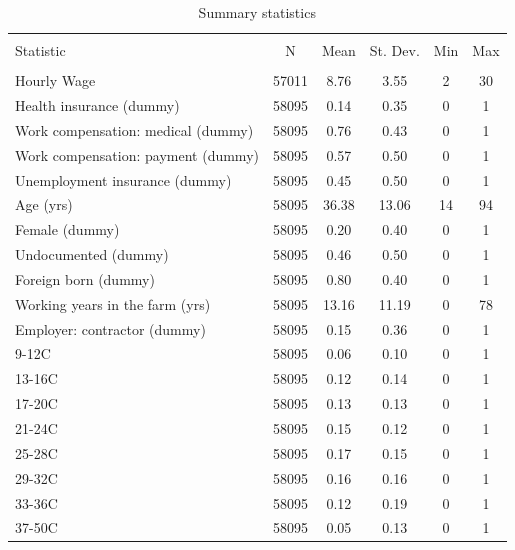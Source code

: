 \documentclass[12pt]{article}
\begin{document}
\begin{table}[!h] 
\centering 
\caption{Summary statistics}
  \footnotesize
  \label{summarystat} 
\begin{tabular}{@{\extracolsep{5pt}}lccccc} 
\\[-1.8ex]\hline 
\hline \\[-1.8ex] 
Statistic & \multicolumn{1}{c}{N} & \multicolumn{1}{c}{Mean} & \multicolumn{1}{c}{St. Dev.} & \multicolumn{1}{c}{Min} & \multicolumn{1}{c}{Max} \\ 
\hline \\[-1.8ex] 
Hourly Wage         &       57011&        8.76&        3.55&           2&          30\\
Health insurance (dummy)&       58095&        0.14&        0.35&           0&           1\\
Work compensation: medical (dummy)&       58095&        0.76&        0.43&           0&           1\\
Work compensation: payment (dummy)&       58095&        0.57&        0.50&           0&           1\\
Unemployment insurance (dummy)&       58095&        0.45&        0.50&           0&           1\\
Age (yrs)           &       58095&       36.38&       13.06&          14&          94\\
Female (dummy)      &       58095&        0.20&        0.40&           0&           1\\
Undocumented (dummy)&       58095&        0.46&        0.50&           0&           1\\
Foreign born (dummy)&       58095&        0.80&        0.40&           0&           1\\
Working years in the farm (yrs)&       58095&       13.16&       11.19&           0&          78\\
Employer: contractor (dummy)&       58095&        0.15&        0.36&           0&           1\\
9-12C               &       58095&        0.06&        0.10&           0&           1\\
13-16C              &       58095&        0.12&        0.14&           0&           1\\
17-20C              &       58095&        0.13&        0.13&           0&           1\\
21-24C              &       58095&        0.15&        0.12&           0&           1\\
25-28C              &       58095&        0.17&        0.15&           0&           1\\
29-32C              &       58095&        0.16&        0.16&           0&           1\\
33-36C              &       58095&        0.12&        0.19&           0&           1\\
37-50C              &       58095&        0.05&        0.13&           0&           1\\
\hline
\end{tabular} 
\end{table} 
\end{document}
